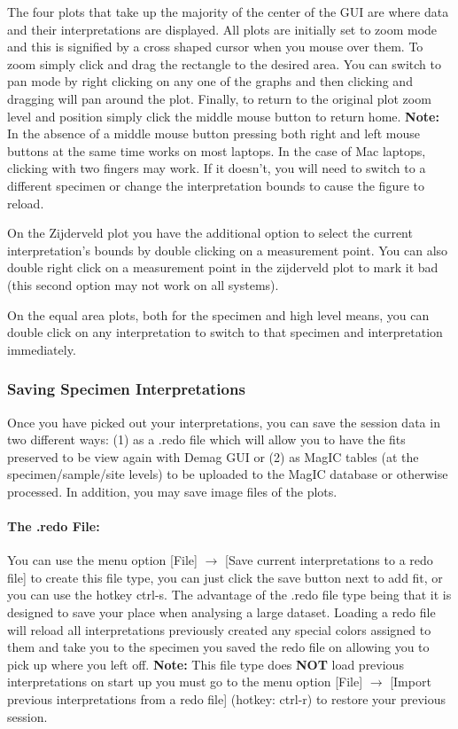 \documentclass[11pt]{book}
\begin{document}
{{The four plots that take up the majority of the center of the GUI are where data and their interpretations are displayed. All plots are initially set to zoom mode and this is signified by a cross shaped cursor when you mouse over them. To zoom simply click and drag the rectangle to the desired area. You can switch to pan mode by right clicking on any one of the graphs and then clicking and dragging will pan around the plot. Finally, to return to the original plot zoom level and position simply click the middle mouse button to return home. \textbf{Note:} In the absence of a middle mouse button pressing both right and left mouse buttons at the same time works on most laptops.  In the case of Mac laptops, clicking with two fingers may work.  If it doesn't, you will need to switch to a different specimen or change the interpretation bounds to cause the figure to reload.

\noindent On the Zijderveld plot you have the additional option to select the current interpretation's bounds by double clicking on a measurement point. You can also double right click on a measurement point in the zijderveld plot to mark it bad (this second option may not work on all systems).

\noindent On the equal area plots, both for the specimen and high level means, you can double click on any interpretation to switch to that specimen and interpretation immediately.

\subsubsection{Saving Specimen Interpretations}\label{saving-specimen-interpretations}

Once you have picked out your interpretations, you can save the session data in two different ways: (1) as a .redo file which will allow you to have the fits preserved to be view again with Demag GUI or (2) as MagIC tables (at the specimen/sample/site levels) to be uploaded to the MagIC database or otherwise processed. In addition, you may save image files of the plots.

\paragraph{The .redo File:}\label{the-.redo-file} You can use the menu option [File] $\rightarrow$ [Save current interpretations to a redo file] to create this file type, you can just click the save button next to add fit, or you can use the hotkey ctrl-s. The advantage of the .redo file type being that it is designed to save your place when analysing a large dataset. Loading a redo file will reload all interpretations previously created any special colors assigned to them and take you to the specimen you saved the redo file on allowing you to pick up where you left off. \textbf{Note:} This file type does \textbf{NOT} load previous interpretations on start up you must go to the menu option [File] $\rightarrow$ [Import previous interpretations from a redo file] (hotkey: ctrl-r) to restore your previous session.

}}
\end{document}
